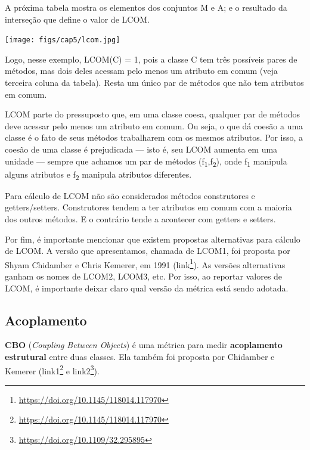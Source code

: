 \documentclass[
  11pt,
  twoside]{book}
\DeclareRobustCommand{\href}[2]{#2\footnote{\url{#1}}}
\let\origfigure\figure
\let\endorigfigure\endfigure
\renewenvironment{figure}[1][2] {
    \expandafter\origfigure\expandafter[!h]
} {
    \endorigfigure
}
\begin{document}
A próxima tabela mostra os elementos dos conjuntos M e A; e o resultado
da interseção que define o valor de LCOM.

\begin{figure}
\centering
\texttt{[image: figs/cap5/lcom.jpg]}
\caption{Exemplo de cálculo de LCOM}
\end{figure}

Logo, nesse exemplo, LCOM(C) = 1, pois a classe C tem três possíveis
pares de métodos, mas dois deles acessam pelo menos um atributo em comum
(veja terceira coluna da tabela). Resta um único par de métodos que não
tem atributos em comum.

LCOM parte do pressuposto que, em uma classe coesa, qualquer par de
métodos deve acessar pelo menos um atributo em comum. Ou seja, o que dá
coesão a uma classe é o fato de seus métodos trabalharem com os mesmos
atributos. Por isso, a coesão de uma classe é prejudicada --- isto é,
seu LCOM aumenta em uma unidade --- sempre que achamos um par de métodos
(f\textsubscript{1},f\textsubscript{2}), onde f\textsubscript{1}
manipula alguns atributos e f\textsubscript{2} manipula atributos
diferentes.

Para cálculo de LCOM não são considerados métodos construtores e
getters/setters. Construtores tendem a ter atributos em comum com a
maioria dos outros métodos. E o contrário tende a acontecer com getters
e setters.

Por fim, é importante mencionar que existem propostas alternativas para
cálculo de LCOM. A versão que apresentamos, chamada de LCOM1, foi
proposta por Shyam Chidamber e Chris Kemerer, em 1991
(\href{https://doi.org/10.1145/118014.117970}{link}). As versões
alternativas ganham os nomes de LCOM2, LCOM3, etc. Por isso, ao reportar
valores de LCOM, é importante deixar claro qual versão da métrica está
sendo adotada.

\hypertarget{acoplamento-1}{%
\subsection{Acoplamento}\label{acoplamento-1}}


\textbf{CBO} (\emph{Coupling Between Objects}) é uma métrica para medir
\textbf{acoplamento estrutural} entre duas classes. Ela também foi
proposta por Chidamber e Kemerer
(\href{https://doi.org/10.1145/118014.117970}{{link1}} e
\href{https://doi.org/10.1109/32.295895}{{link2}}).
\end{document}
